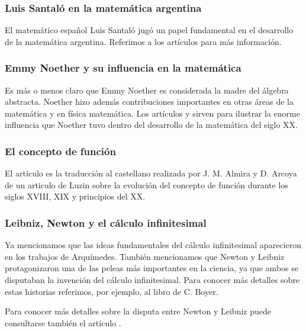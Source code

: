 


\subsubsection*{Luis Santaló en la matemática argentina}

El matemático español Luis Santaló jugó un papel fundamental
en el desarrollo de la matemática argentina. Referimos a 
los artículos 
\cite{zbMATH06696371,zbMATH06696401} para más información.



% 
\subsubsection*{Emmy Noether y su influencia en la matemática}

Es más o menos claro que Emmy Noether es considerada la madre del álgebra abstracta. 
Noether hizo además contribuciones importantes en otras áreas de la matemática 
y en física matemática. Los artículos 
\cite{zbMATH06696362} y \cite{zbMATH06696361} sirven para 
ilustrar la enorme influencia que Noether tuvo dentro del 
desarrollo de la matemática
del siglo XX. 

\subsubsection*{El concepto de función}

El artículo \cite{zbMATH02353879} es la traducción al castellano 
realizada por J. M. Almira y D. Arcoya de un 
articulo de Luzin sobre la evolución del 
concepto de función durante los siglos XVIII, XIX y principios del XX.

\subsubsection*{Leibniz, Newton y el cálculo infinitesimal}

Ya mencionamos que las ideas fundamentales del cálculo infinitesimal 
aparecieron en los trabajos de Arquímedes. También mencionamos que
Newton y Leibniz protagonizaron una de las peleas más importantes
en la ciencia, ya que ambos se disputaban la invención del cálculo 
infinitesimal. Para conocer más detalles sobre estas historias
referimos, por ejemplo, al libro 
\cite{MR0124178} de C. Boyer. 

Para conocer más detalles sobre la disputa entre Newton y Leibniz 
puede consultarse también el artículo \cite{MR4224032}. 
